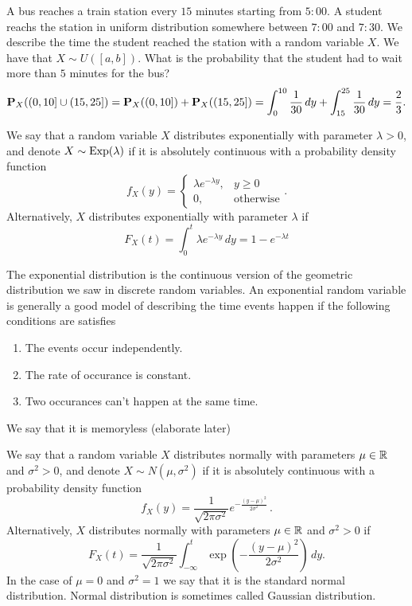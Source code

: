 \documentclass[11pt,a4paper]{article}
\begin{document}
  \begin{example}
    A bus reaches a train station every $15$ minutes starting from $5:00$.
    A student reachs the station in uniform distribution somewhere between
    $7:00$ and $7:30$. We describe the time the student reached the station
    with a random variable $X$. We have that $X \sim U([a,b])$. What
    is the probability that the student had to wait more than $5$ minutes
    for the bus?
    \[
      \mathbf{P}_X((0,10] \cup (15,25]) =
      \mathbf{P}_X((0,10]) + \mathbf{P}_X((15,25]) =
      \int_{0}^{10} \frac{1}{30}\,dy + \int_{15}^{25} \frac{1}{30}\,dy =
      \frac{2}{3}.
    \]
  \end{example}

  \begin{definition}
    We say that a random variable $X$ distributes exponentially with parameter
    $\lambda > 0$, and denote $X \sim \operatorname{Exp}(\lambda)$
    if it is absolutely continuous with a probability density function
    \[
      f_X(y) =
      \begin{cases}
        \lambda e^{-\lambda y}, &y \geq 0 \\
        0, &\text{otherwise}
      \end{cases}.
    \]
    Alternatively, $X$ distributes exponentially with parameter $\lambda$ if
    \[
      F_X(t) = \int_{0}^{t} \lambda e^{-\lambda y}\,dy = 1 - e^{-\lambda t}
    \]
  \end{definition}

  The exponential distribution is the continuous version of the geometric
  distribution we saw in discrete random variables. An exponential random
  variable is generally a good model of describing the time events happen
  if the following conditions are satisfies
  \begin{enumerate}
    \item The events occur independently.
    \item The rate of occurance is constant.
    \item Two occurances can't happen at the same time.
  \end{enumerate}
  We say that it is memoryless (elaborate later) %

  \begin{definition}
    We say that a random variable $X$ distributes normally with parameters
    $\mu \in \mathbb{R}$ and $\sigma^2 > 0$, and denote $X \sim N(\mu, \sigma^2)$
    if it is absolutely continuous with a probability density function
    \[
      f_X(y) = 
      \frac {1}{\sqrt {2\pi \sigma ^{2}}}
      e^{-{\frac {(y-\mu)^{2}}{2\sigma ^{2}}}}\,.
    \]
    Alternatively, $X$ distributes normally with parameters $\mu \in \mathbb{R}$ and 
    $\sigma^2 > 0$ if
    \[
      F_X(t) = 
      \frac{1}{\sqrt{2\pi\sigma^{2}}}
      \int_{-\infty}^{t}
      \exp\left(-\frac{(y-\mu)^{2}}{2\sigma^{2}}\right)\,dy.
    \]
    In the case of $\mu = 0$ and $\sigma^2 = 1$ we say that it is the 
    standard normal distribution.
    Normal distribution is sometimes called Gaussian distribution.
  \end{definition}
\end{document}
